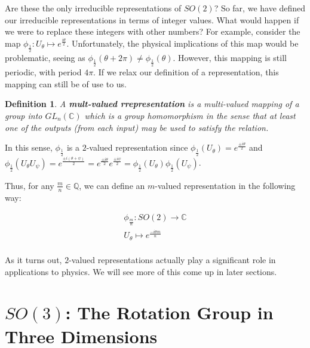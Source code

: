 \documentclass[10pt]{ucthesis}
\newcommand{\Z}{\mathbb{Z}}
\newcommand{\C}{\mathbb{C}}
\newcommand{\Q}{\mathbb{Q}}
\newtheorem{definition}{Definition}[chapter]
\begin{document}


Are these the only irreducible representations of $SO(2)$? So far, we have defined our irreducible representations in terms of integer values. What would happen if we were to replace these integers with other numbers? For example, consider the map $\phi_{\frac{1}{2}}: U_\theta \mapsto e^\frac{i\theta}{2}$. Unfortunately, the physical implications of this map would be problematic, seeing as $\phi_\frac{1}{2}(\theta + 2\pi) \neq  \phi_\frac{1}{2}(\theta)$. However, this mapping is still periodic, with period $4\pi$. If we relax our definition of a representation, this mapping can still be of use to us.

\begin{definition}
	A \textbf{mult-valued rrepresentation} is a multi-valued mapping of a group into $GL_n(\C)$ which is a group homomorphism in the sense that at least one of the outputs (from each input) may be used to satisfy the relation.
\end{definition}

In this sense, $\phi_{\frac{1}{2}}$ is a $2$-valued representation since $\phi_{\frac{1}{2}}(U_\theta) = e^\frac{\pm i\theta}{2}$ and $\phi_{\frac{1}{2}}(U_\theta U_\psi) =  e^\frac{\pm i(\theta + \psi)}{2} =  e^\frac{\pm i\theta}{2} e^\frac{\pm i\psi}{2} = \phi_{\frac{1}{2}}(U_\theta)\phi_{\frac{1}{2}}(U_\psi)$.

Thus, for any $\frac{m}{n} \in \Q$, we can define an $m$-valued representation in the following way:

$$\begin{aligned}
	\phi_\frac{m}{n}:SO(2)\rightarrow \C \\
	U_\theta \mapsto e^\frac{-i\theta m}{n} \\
\end{aligned}$$

As it turns out, $2$-valued representations actually play a significant role in applications to physics. We will see more of this come up in later sections.

\chapter{$SO(3)$: The Rotation Group in Three Dimensions}
\end{document}

